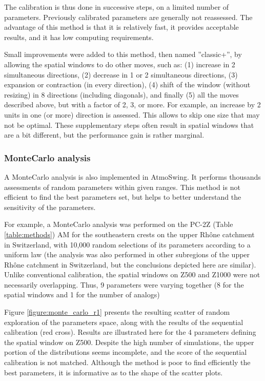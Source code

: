 \documentclass[review]{elsarticle}
\begin{document}
The calibration is thus done in successive steps, on a limited number of parameters. Previously calibrated parameters are generally not reassessed. The advantage of this method is that it is relatively fast, it provides acceptable results, and it has low computing requirements. 

Small improvements were added to this method, then named ''classic+'', by allowing the spatial windows to do other moves, such as: (1) increase in 2 simultaneous directions, (2) decrease in 1 or 2 simultaneous directions, (3) expansion or contraction (in every direction), (4) shift of the window (without resizing) in 8 directions (including diagonals), and finally (5) all the moves described above, but with a factor of 2, 3, or more. For example, an increase by 2 units in one (or more) direction is assessed. This allows to skip one size that may not be optimal. These supplementary steps often result in spatial windows that are a bit different, but the performance gain is rather marginal.

\subsubsection{Monte\textendash Carlo analysis}

A Monte\textendash Carlo analysis is also implemented in AtmoSwing. It performs thousands assessments of random parameters within given ranges. This method is not efficient to find the best parameters set, but helps to better understand the sensitivity of the parameters.

For example, a Monte\textendash Carlo analysis was performed on the PC-2Z (Table \ref{table:methods}) AM for the southeastern crests on the upper Rh\^{o}ne catchment in Switzerland, with 10,000 random selections of its parameters according to a uniform law (the analysis was also performed in other subregions of the upper Rh\^{o}ne catchment in Switzerland, but the conclusions depicted here are similar). Unlike conventional calibration, the spatial windows on Z500 and Z1000 were not necessarily overlapping. Thus, 9 parameters were varying together (8 for the spatial windows and 1 for the number of analogs)

Figure \ref{figure:monte_carlo_r1} presents the resulting scatter of random exploration of the parameters space, along with the results of the sequential calibration (red cross). Results are illustrated here for the 4 parameters defining the spatial window on Z500. Despite the high number of simulations, the upper portion of the distributions seems incomplete, and the score of the sequential calibration is not matched. Although the method is poor to find efficiently the best parameters, it is informative as to the shape of the scatter plots.
\end{document}
